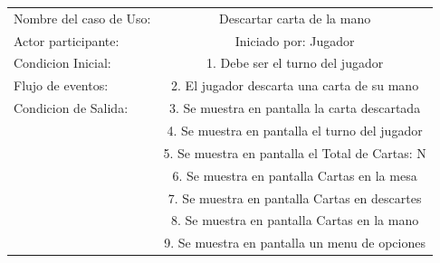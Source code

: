 \documentclass[60pt]{article}
\begin{document}
\begin{center}
    \begin{tabular}{ l | c  }
        
        Nombre del caso de Uso: & Descartar carta de la mano                      \\
        Actor participante:     & Iniciado por: Jugador                           \\\hline
        Condicion Inicial:      & 1. Debe ser el turno del jugador                \\
        Flujo de eventos:       & 2. El jugador descarta una carta de su mano     \\\hline
        Condicion de Salida:    & 3. Se muestra en pantalla la carta descartada   \\
                                & 4. Se muestra en pantalla el turno del jugador  \\
                                & 5. Se muestra en pantalla el Total de Cartas: N \\
                                & 6. Se muestra en pantalla Cartas en la mesa     \\
                                & 7. Se muestra en pantalla Cartas en descartes   \\
                                & 8. Se muestra en pantalla Cartas en la mano     \\
                                & 9. Se muestra en pantalla un menu de opciones   \\ 
    \end{tabular} \\
\end{center}
\end{document}
